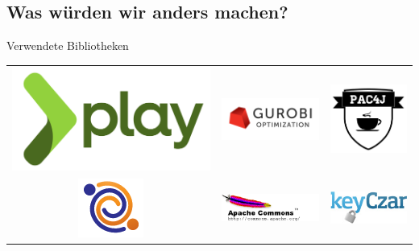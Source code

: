 \documentclass[18pt]{beamer}
\begin{document}
\subsection{Was würden wir anders machen?}
\begin{frame}{Verwendete Bibliotheken}
	\begin{tabular}{ccc}
		\includegraphics[width=0.3\linewidth, height=0.3\textheight, keepaspectratio]{bilder/play_full_color.png} &
		\includegraphics[width=0.3\linewidth, height=0.3\textheight, keepaspectratio]{bilder/gurobi.png} &
		\includegraphics[width=0.3\linewidth, height=0.3\textheight, keepaspectratio]{bilder/pac4j.png}\\
		\includegraphics[width=0.3\linewidth, height=0.3\textheight, keepaspectratio]{bilder/ebean.png}&
		\includegraphics[width=0.3\linewidth, height=0.3\textheight, keepaspectratio]{bilder/apache.png}&
		\includegraphics[width=0.3\linewidth, height=0.3\textheight, keepaspectratio]{bilder/keyczar.jpg} \\
	\end{tabular}
	
\end{frame}
\end{document}

